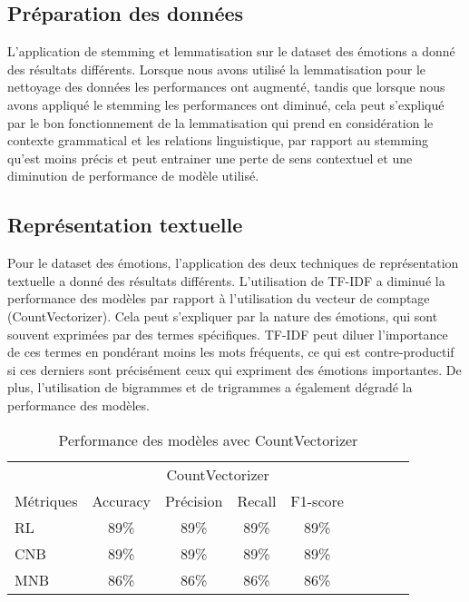 \subsection{Préparation des données}
L’application de stemming et lemmatisation sur le dataset des émotions a donné des résultats différents. Lorsque nous avons utilisé la lemmatisation pour le nettoyage des données les performances ont augmenté, tandis que lorsque nous avons appliqué le stemming les performances ont diminué, cela peut s’expliqué par le bon fonctionnement de la lemmatisation qui prend en considération le contexte grammatical et les relations linguistique, par rapport au stemming qu’est moins précis et peut entrainer une perte de sens contextuel et une diminution de performance de modèle utilisé.

\subsection{Représentation textuelle}
Pour le dataset des émotions, l'application des deux techniques de représentation textuelle a donné des résultats différents. L'utilisation de TF-IDF a diminué la performance des modèles par rapport à l'utilisation du vecteur de comptage (CountVectorizer). Cela peut s'expliquer par la nature des émotions, qui sont souvent exprimées par des termes spécifiques. TF-IDF peut diluer l'importance de ces termes en pondérant moins les mots fréquents, ce qui est contre-productif si ces derniers sont précisément ceux qui expriment des émotions importantes. De plus, l'utilisation de bigrammes et de trigrammes a également dégradé la performance des modèles.
\begin{table}[h!]
    \centering
    \caption{Performance des modèles avec CountVectorizer}
    \begin{tabular}{lcccccccc}
        \toprule
        & \multicolumn{4}{c}{CountVectorizer} \\
        \cmidrule(lr){2-5}
        Métriques & Accuracy & Précision & Recall & F1-score \\
        \midrule
        RL & 89\% & 89\% & 89\% & 89\% \\
        CNB & 89\% & 89\% & 89\% & 89\% \\
        MNB & 86\% & 86\% & 86\% & 86\% \\
        \bottomrule
    \end{tabular}
\end{table}

